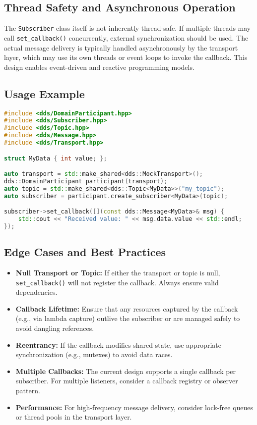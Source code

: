 \documentclass[12pt]{report}
\begin{document}
\subsection{Thread Safety and Asynchronous Operation}
The \texttt{Subscriber} class itself is not inherently thread-safe. If multiple threads may call \texttt{set\_callback()} concurrently, external synchronization should be used. The actual message delivery is typically handled asynchronously by the transport layer, which may use its own threads or event loops to invoke the callback. This design enables event-driven and reactive programming models.

\subsection{Usage Example}
\begin{lstlisting}[language=C++]
#include <dds/DomainParticipant.hpp>
#include <dds/Subscriber.hpp>
#include <dds/Topic.hpp>
#include <dds/Message.hpp>
#include <dds/Transport.hpp>

struct MyData { int value; };

auto transport = std::make_shared<dds::MockTransport>();
dds::DomainParticipant participant(transport);
auto topic = std::make_shared<dds::Topic<MyData>>("my_topic");
auto subscriber = participant.create_subscriber<MyData>(topic);

subscriber->set_callback([](const dds::Message<MyData>& msg) {
    std::cout << "Received value: " << msg.data.value << std::endl;
});
\end{lstlisting}

\subsection{Edge Cases and Best Practices}
\begin{itemize}
    \item \textbf{Null Transport or Topic:} If either the transport or topic is null, \texttt{set\_callback()} will not register the callback. Always ensure valid dependencies.
    \item \textbf{Callback Lifetime:} Ensure that any resources captured by the callback (e.g., via lambda capture) outlive the subscriber or are managed safely to avoid dangling references.
    \item \textbf{Reentrancy:} If the callback modifies shared state, use appropriate synchronization (e.g., mutexes) to avoid data races.
    \item \textbf{Multiple Callbacks:} The current design supports a single callback per subscriber. For multiple listeners, consider a callback registry or observer pattern.
    \item \textbf{Performance:} For high-frequency message delivery, consider lock-free queues or thread pools in the transport layer.
\end{itemize}
\end{document}
